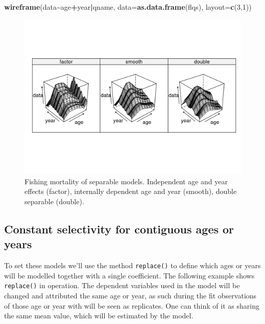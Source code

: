 \documentclass[
]{book}
\newenvironment{Shaded}{\begin{snugshade}}{\end{snugshade}}
\newcommand{\AttributeTok}[1]{\textcolor[rgb]{0.13,0.29,0.53}{#1}}
\newcommand{\DecValTok}[1]{\textcolor[rgb]{0.00,0.00,0.81}{#1}}
\newcommand{\FunctionTok}[1]{\textcolor[rgb]{0.13,0.29,0.53}{\textbf{#1}}}
\newcommand{\NormalTok}[1]{#1}
\newcommand{\SpecialCharTok}[1]{\textcolor[rgb]{0.81,0.36,0.00}{\textbf{#1}}}
\begin{document}
\begin{Shaded}
\begin{Highlighting}[]
\FunctionTok{wireframe}\NormalTok{(data}\SpecialCharTok{\textasciitilde{}}\NormalTok{age}\SpecialCharTok{+}\NormalTok{year}\SpecialCharTok{|}\NormalTok{qname, }\AttributeTok{data=}\FunctionTok{as.data.frame}\NormalTok{(flqs), }\AttributeTok{layout=}\FunctionTok{c}\NormalTok{(}\DecValTok{3}\NormalTok{,}\DecValTok{1}\NormalTok{))}
\end{Highlighting}
\end{Shaded}

\begin{figure}
\centering
\includegraphics{_bookdown_files/_main_files/figure-html/sep01-1.png}
\caption{\label{fig:sep01}Fishing mortality of separable models. Independent age and year effects (factor), internally dependent age and year (smooth), double separable (double).}
\end{figure}

\hypertarget{constant-selectivity-for-contiguous-ages-or-years}{%
\subsection{Constant selectivity for contiguous ages or years}\label{constant-selectivity-for-contiguous-ages-or-years}}

To set these models we'll use the method \texttt{replace()} to define which ages or years will be modelled together with a single coefficient. The following example shows \texttt{replace()} in operation. The dependent variables used in the model will be changed and attributed the same age or year, as such during the fit observations of those age or year with will be seen as replicates. One can think of it as sharing the same mean value, which will be estimated by the model.
\end{document}
